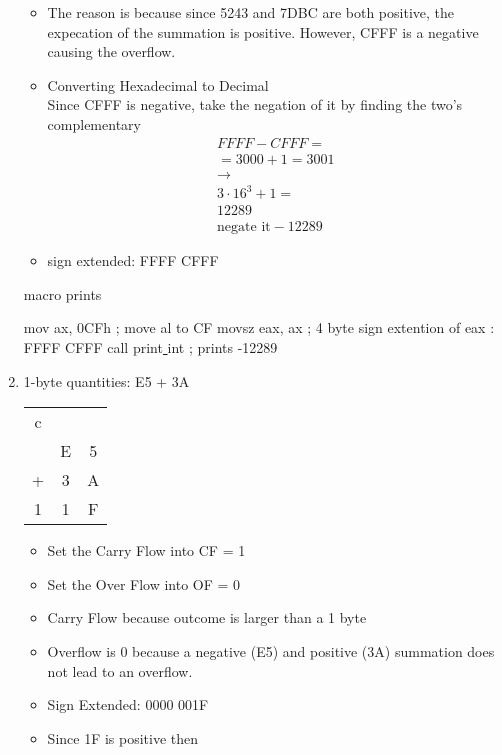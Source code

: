 \documentclass[12pt]{article}
\begin{document}
\begin{enumerate}
\begin{itemize}
    \item The reason is because since 5243 and 7DBC are both positive, the expecation of the summation is positive. However, CFFF is a negative causing the overflow.
    \item Converting Hexadecimal to Decimal \\
    Since CFFF is negative, take the negation of it by finding the two's complementary 
    \begin{align*}
        FFFF - CFFF = \\
         = 3000 + 1 = 3001 \\
         \to \\
         3 \cdot 16^3 + 1 = \\
         12289 \\
         \text{negate it} -12289
    \end{align*}
    \item sign extended: FFFF CFFF
   \end{itemize}
         \begin{algorithm}
   \caption{macro prints}
   \begin{algorithmic}[1]
   \State mov ax, 0CFh ; move al to CF
    \State movsz eax, ax ; 4 byte sign extention of eax : FFFF CFFF 
    \State call print\underline{ }int ; prints -12289
   \end{algorithmic}
   \end{algorithm}
   \clearpage
   \item 1-byte quantities: E5 + 3A 
     \begin{center}
       \begin{tabular}{c c c}
       c &  & \\
        & E  & 5  \\
        +& 3   & A \\
        \hline 
      1 & 1 & F
       \end{tabular}
   \end{center}
   \begin{itemize}
       \item Set the Carry Flow into CF = 1
       \item Set the Over Flow into OF = 0
       \item Carry Flow because outcome is larger than a 1 byte 
       \item Overflow is 0 because a negative (E5) and positive (3A) summation does not lead to an overflow.
       \item Sign Extended: 0000 001F
       \item Since 1F is positive then 

\end{itemize}
\end{enumerate}
\end{document}
